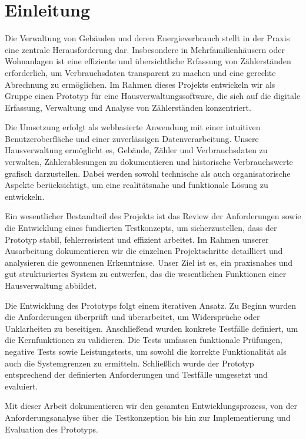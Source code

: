 \section{Einleitung}\label{Einleitung}

Die Verwaltung von Gebäuden und deren Energieverbrauch stellt in der Praxis eine zentrale Herausforderung dar.  
Insbesondere in Mehrfamilienhäusern oder Wohnanlagen ist eine effiziente und übersichtliche Erfassung von Zählerständen erforderlich, um Verbrauchsdaten transparent zu machen und eine gerechte Abrechnung zu ermöglichen.  
Im Rahmen dieses Projekts entwickeln wir als Gruppe einen Prototyp für eine Hausverwaltungssoftware, die sich auf die digitale Erfassung, Verwaltung und Analyse von Zählerständen konzentriert.\par

Die Umsetzung erfolgt als webbasierte Anwendung mit einer intuitiven Benutzeroberfläche und einer zuverlässigen Datenverarbeitung.  
Unsere Hausverwaltung ermöglicht es, Gebäude, Zähler und Verbrauchsdaten zu verwalten, Zählerablesungen zu dokumentieren und historische Verbrauchswerte grafisch darzustellen.  
Dabei werden sowohl technische als auch organisatorische Aspekte berücksichtigt, um eine realitätsnahe und funktionale Lösung zu entwickeln. \par

Ein wesentlicher Bestandteil des Projekts ist das Review der Anforderungen sowie die Entwicklung eines fundierten Testkonzepts, um sicherzustellen, dass der Prototyp stabil, fehlerresistent und effizient arbeitet.  
Im Rahmen unserer Ausarbeitung dokumentieren wir die einzelnen Projektschritte detailliert und analysieren die gewonnenen Erkenntnisse.  
Unser Ziel ist es, ein praxisnahes und gut strukturiertes System zu entwerfen, das die wesentlichen Funktionen einer Hausverwaltung abbildet.  \par

Die Entwicklung des Prototyps folgt einem iterativen Ansatz.  
Zu Beginn wurden die Anforderungen überprüft und überarbeitet, um Widersprüche oder Unklarheiten zu beseitigen.  
Anschließend wurden konkrete Testfälle definiert, um die Kernfunktionen zu validieren.  
Die Tests umfassen funktionale Prüfungen, negative Tests sowie Leistungstests, um sowohl die korrekte Funktionalität als auch die Systemgrenzen zu ermitteln.  
Schließlich wurde der Prototyp entsprechend der definierten Anforderungen und Testfälle umgesetzt und evaluiert.  \par

Mit dieser Arbeit dokumentieren wir den gesamten Entwicklungsprozess, von der Anforderungsanalyse über die Testkonzeption bis hin zur Implementierung und Evaluation des Prototyps.  \par